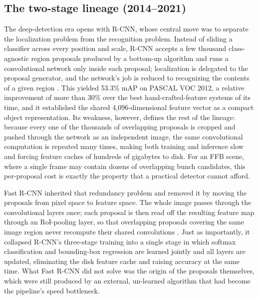 \subsection{The two-stage lineage (2014--2021)}

The deep-detection era opens with R-CNN, whose central move was to separate the localization problem from the recognition problem. Instead of sliding a classifier across every position and scale, R-CNN accepts a few thousand class-agnostic region proposals produced by a bottom-up algorithm and runs a convolutional network only inside each proposal; localization is delegated to the proposal generator, and the network's job is reduced to recognizing the contents of a given region \cite{girshick2014rcnn}. This yielded 53.3\% mAP on PASCAL VOC 2012, a relative improvement of more than 30\% over the best hand-crafted-feature systems of its time, and it established the shared 4{,}096-dimensional feature vector as a compact object representation. Its weakness, however, defines the rest of the lineage: because every one of the thousands of overlapping proposals is cropped and pushed through the network as an independent image, the same convolutional computation is repeated many times, making both training and inference slow and forcing feature caches of hundreds of gigabytes to disk. For an FFB scene, where a single frame may contain dozens of overlapping bunch candidates, this per-proposal cost is exactly the property that a practical detector cannot afford.

Fast R-CNN inherited that redundancy problem and removed it by moving the proposals from pixel space to feature space. The whole image passes through the convolutional layers once; each proposal is then read off the resulting feature map through an RoI-pooling layer, so that overlapping proposals covering the same image region never recompute their shared convolutions \cite{girshick2015fastrcnn}. Just as importantly, it collapsed R-CNN's three-stage training into a single stage in which softmax classification and bounding-box regression are learned jointly and all layers are updated, eliminating the disk feature cache and raising accuracy at the same time. What Fast R-CNN did not solve was the origin of the proposals themselves, which were still produced by an external, un-learned algorithm that had become the pipeline's speed bottleneck.

